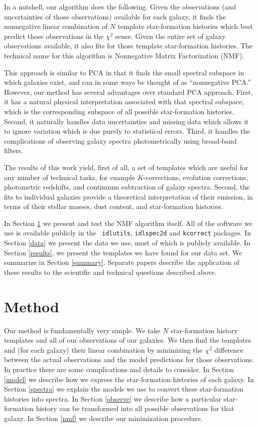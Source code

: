 \documentclass[10pt]{aastex}
\begin{document}
In a nutshell, our algorithm does the following. Given the
observations (and uncertainties of those observations) available for
each galaxy, it finds the nonnegative linear combination of $N$
template star-formation histories which best predict those
observations in the $\chi^2$ sense. Given the entire set of galaxy
observations available, it also fits for those template star-formation
histories. The technical name for this algorithm is Nonnegative Matrix
Factorization (NMF).

This approach is similar to PCA in that it finds the small spectral
subspace in which galaxies exist, and can in some ways be thought of
as ``nonnegative PCA.''  However, our method has several advantages
over standard PCA approach. First, it has a natural physical
interpretation associated with that spectral subspace, which is the
corresponding subspace of all possible star-formation
histories. Second, it naturally handles data uncertainties and missing
data which allows it to ignore variation which is due purely to
statistical errors.  Third, it handles the complications of observing
galaxy spectra photometrically using broad-band filters.

The results of this work yield, first of all, a set of templates which
are useful for any number of technical tasks, for example
$K$-corrections, evolution corrections, photometric redshifts, and
continuum subtraction of galaxy spectra. Second, the fits to
individual galaxies provide a theoretical interpretation of their
emission, in terms of their stellar masses, dust content, and
star-formation histories.

In Section \ref{algorithm} we present and test the NMF algorithm
itself. All of the software we use is available publicly in the {\tt
idlutils}, {\tt idlspec2d} and {\tt kcorrect} packages.  In Section
\ref{data} we present the data we use, most of which is publicly
available. In Section \ref{results}, we present the templates we have
found for our data set. We summarize in Section
\ref{summary}. Separate papers describe the application of these
results to the scientific and technical questions described above.

\section{Method}
\label{algorithm}

Our method is fundamentally very simple. We take $N$ star-formation
history templates and all of our observations of our galaxies.  We
then find the templates and (for each galaxy) their linear combination
by minimizing the $\chi^2$ difference between the actual observations
and the model predictions for those observations. In practice there
are some complications and details to consider. In Section \ref{model}
we describe how we express the star-formation histories of each
galaxy.  In Section \ref{spectra} we explain the models we use to
convert these star-formation histories into spectra. In Section
\ref{observe} we describe how a particular star-formation history can
be transformed into all possible observations for that galaxy. In
Section \ref{nmf} we describe our minimization procedure.
\end{document}
